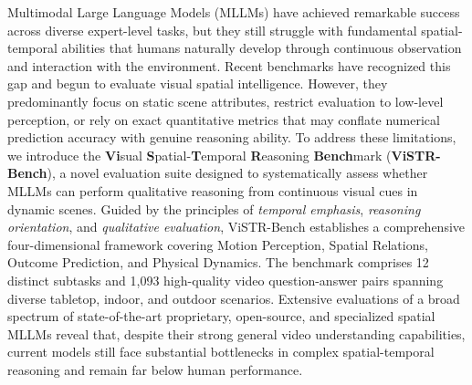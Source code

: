 Multimodal Large Language Models (MLLMs) have achieved remarkable success across diverse expert-level tasks, but they still struggle with fundamental spatial-temporal abilities that humans naturally develop through continuous observation and interaction with the environment.
Recent benchmarks have recognized this gap and begun to evaluate visual spatial intelligence. However, they predominantly focus on static scene attributes, restrict evaluation to low-level perception, or rely on exact quantitative metrics that may conflate numerical prediction accuracy with genuine reasoning ability.
To address these limitations, we introduce the \textbf{Vi}sual \textbf{S}patial-\textbf{T}emporal \textbf{R}easoning \textbf{Bench}mark (\textbf{ViSTR-Bench}), a novel evaluation suite designed to systematically assess whether MLLMs can perform qualitative reasoning from continuous visual cues in dynamic scenes.
Guided by the principles of \textit{temporal emphasis}, \textit{reasoning orientation}, and \textit{qualitative evaluation}, ViSTR-Bench establishes a comprehensive four-dimensional framework covering Motion Perception, Spatial Relations, Outcome Prediction, and Physical Dynamics.
The benchmark comprises 12 distinct subtasks and 1,093 high-quality video question-answer pairs spanning diverse tabletop, indoor, and outdoor scenarios.
Extensive evaluations of a broad spectrum of state-of-the-art proprietary, open-source, and specialized spatial MLLMs reveal that, despite their strong general video understanding capabilities, current models still face substantial bottlenecks in complex spatial-temporal reasoning and remain far below human performance.